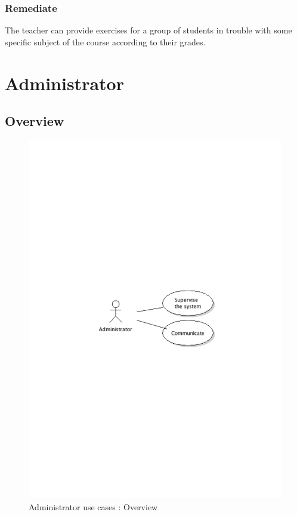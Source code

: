 		\subsubsection{Remediate}
			The teacher can provide exercises for a group of students in trouble with some specific subject of the course according to their grades.
\newpage
\section{Administrator}
	\subsection{Overview}
		\begin{figure}[ht]
			\begin{center}
				\includegraphics[width=\textwidth, trim=2cm 12cm 2cm 12cm]{UML_figure/use_cases/administrator/UC_Administrator_General.pdf}
				\caption{Administrator use cases : Overview}
			\end{center}
		\end{figure}
